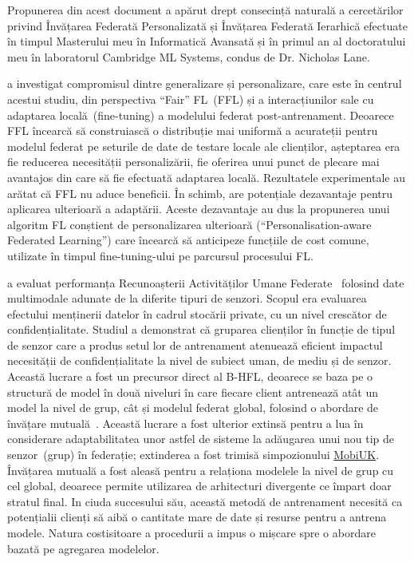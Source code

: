 Propunerea din acest document a apărut drept consecință naturală a cercetărilor privind Învățarea Federată Personalizată și Învățarea Federată Ierarhică efectuate în timpul Masterului meu în Informatică Avansată și în primul an al doctoratului meu în laboratorul Cambridge ML Systems, condus de Dr. Nicholas Lane.

\citet{EuroMLSysWorkshop} a investigat compromisul dintre generalizare și personalizare, care este în centrul acestui studiu, din perspectiva ``Fair'' FL~(FFL) și a interacțiunilor sale cu adaptarea locală~(fine-tuning) a modelului federat post-antrenament. Deoarece FFL încearcă să construiască o distribuție mai uniformă a acurateții pentru modelul federat pe seturile de date de testare locale ale clienților, așteptarea era fie reducerea necesității personalizării, fie oferirea unui punct de plecare mai avantajos din care să fie efectuată adaptarea locală. Rezultatele experimentale au arătat că FFL nu aduce beneficii. În schimb, are potențiale dezavantaje pentru aplicarea ulterioară a adaptării. Aceste dezavantaje au dus la propunerea unui algoritm FL conștient de personalizarea ulterioară (``Personalisation-aware Federated Learning'') care încearcă să anticipeze funcțiile de cost comune, utilizate în timpul fine-tuning-ului pe parcursul procesului FL.

\citet{OperaWorkshop} a evaluat performanța Recunoașterii Activităților Umane Federate~\citep{HARusingFL_2018} folosind date multimodale adunate de la diferite tipuri de senzori. Scopul era evaluarea efectului menținerii datelor în cadrul stocării private, cu un nivel crescător de confidențialitate. Studiul a demonstrat că gruparea clienților în funcție de tipul de senzor care a produs setul lor de antrenament atenuează eficient impactul necesității de confidențialitate la nivel de subiect uman, de mediu și de senzor. Această lucrare a fost un precursor direct al B-HFL, deoarece se baza pe o structură de model în două niveluri în care fiecare client antrenează atât un model la nivel de grup, cât și modelul federat global, folosind o abordare de învățare mutuală~\citep{DeepMutualLearning}. Această lucrare a fost ulterior extinsă pentru a lua în considerare adaptabilitatea unor astfel de sisteme la adăugarea unui nou tip de senzor~(grup) în federație; extinderea a fost trimisă simpozionului \href{https://mobiuk.org/2023}{MobiUK}. Învățarea mutuală a fost aleasă pentru a relaționa modelele la nivel de grup cu cel global, deoarece permite utilizarea de arhitecturi divergente ce împart doar stratul final. In ciuda succesului său, această metodă de antrenament necesită ca potențialii clienți să aibă o cantitate mare de date și resurse pentru a antrena modele. Natura costisitoare a procedurii a impus o mișcare spre o abordare bazată pe agregarea modelelor.

